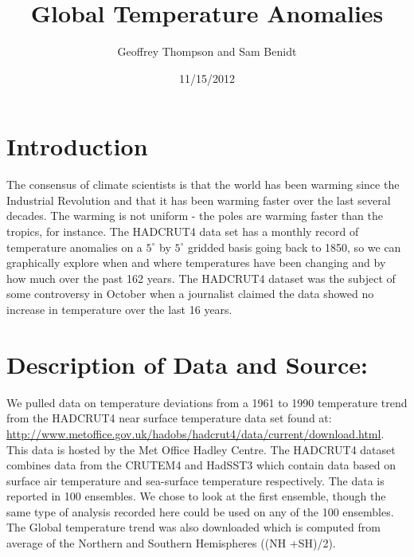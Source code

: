 \documentclass{article}\usepackage{graphicx, color}
\title{Global Temperature Anomalies}
\author{Geoffrey Thompson and Sam Benidt}
\date{11/15/2012}
\begin{document}
\maketitle




\section{Introduction}
The consensus of climate scientists is that the world has been warming since the Industrial Revolution and that it has been warming faster over the last several decades. The warming is not uniform - the poles are warming faster than the tropics, for instance. The HADCRUT4 data set has a monthly record of temperature anomalies on a $5^{\circ}$ by $5^{\circ}$ gridded basis going back to 1850, so we can graphically explore when and where temperatures have been changing and by how much over the past 162 years. The HADCRUT4 dataset was the subject of some controversy in October when a journalist claimed the data showed no increase in temperature over the last 16 years.

\section{Description of Data and Source:}
We pulled data on temperature deviations from a 1961 to 1990 temperature trend from the HADCRUT4 near surface temperature data set found at: \url{http://www.metoffice.gov.uk/hadobs/hadcrut4/data/current/download.html}. This data is hosted by the Met Office Hadley Centre. The HADCRUT4 dataset combines data from the  CRUTEM4 and HadSST3 which contain data based on surface air temperature and sea-surface temperature respectively. The data is reported in 100 ensembles. We chose to look at the first ensemble, though the same type of analysis recorded here could be used on any of the 100 ensembles.  The Global temperature trend was also downloaded which is computed from average of the Northern and Southern Hemispheres ((NH +SH)/2).
\end{document}
